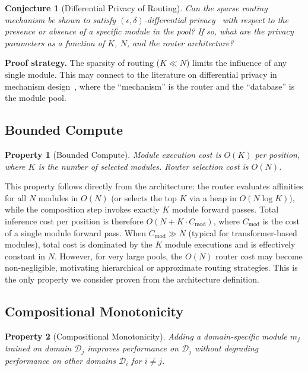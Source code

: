 \documentclass[11pt,a4paper]{article}
\newtheorem{property}{Property}
\newtheorem{conjecture}{Conjecture}
\begin{document}
\begin{conjecture}[Differential Privacy of Routing]
Can the sparse routing mechanism be shown to satisfy $(\epsilon, \delta)$-differential privacy~\cite{dwork2014algorithmic} with respect to the presence or absence of a specific module in the pool? If so, what are the privacy parameters as a function of $K$, $N$, and the router architecture?
\end{conjecture}

\noindent\textbf{Proof strategy.} The sparsity of routing ($K \ll N$) limits the influence of any single module. This may connect to the literature on differential privacy in mechanism design~\cite{dwork2014algorithmic}, where the ``mechanism'' is the router and the ``database'' is the module pool.

\subsection{Bounded Compute}
\label{sec:bounded}

\begin{property}[Bounded Compute]
Module execution cost is $O(K)$ per position, where $K$ is the number of selected modules. Router selection cost is $O(N)$.
\end{property}

\noindent This property follows directly from the architecture: the router evaluates affinities for all $N$ modules in $O(N)$ (or selects the top $K$ via a heap in $O(N \log K)$), while the composition step invokes exactly $K$ module forward passes. Total inference cost per position is therefore $O(N + K \cdot C_{\text{mod}})$, where $C_{\text{mod}}$ is the cost of a single module forward pass. When $C_{\text{mod}} \gg N$ (typical for transformer-based modules), total cost is dominated by the $K$ module executions and is effectively constant in $N$. However, for very large pools, the $O(N)$ router cost may become non-negligible, motivating hierarchical or approximate routing strategies. This is the only property we consider proven from the architecture definition.

\subsection{Compositional Monotonicity}
\label{sec:monotonicity}

\begin{property}[Compositional Monotonicity]
Adding a domain-specific module $m_j$ trained on domain $\mathcal{D}_j$ improves performance on $\mathcal{D}_j$ without degrading performance on other domains $\mathcal{D}_i$ for $i \neq j$.
\end{property}
\end{document}
